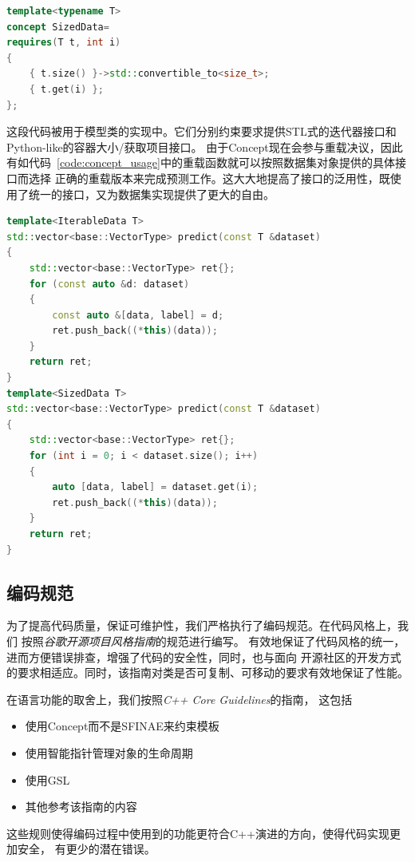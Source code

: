 \documentclass[a4paper,twoside,twocolumn]{article}
\begin{document}
\begin{spacing}{1.2}
\begin{lstlisting}[language=c++,style=CppStyle,caption={Concept},label={code:concept}]
template<typename T>
concept SizedData=
requires(T t, int i)
{
    { t.size() }->std::convertible_to<size_t>;
    { t.get(i) };
};
\end{lstlisting}
这段代码被用于模型类的实现中。它们分别约束要求提供STL式的迭代器接口和Python-like的容器大小/获取项目接口。
由于Concept现在会参与重载决议，因此有如代码~\ref{code:concept_usage}中的重载函数就可以按照数据集对象提供的具体接口而选择
正确的重载版本来完成预测工作。这大大地提高了接口的泛用性，既使用了统一的接口，又为数据集实现提供了更大的自由。

\begin{lstlisting}[language=c++,style=CppStyle,caption={Concept的使用},label={code:concept_usage}]
template<IterableData T>
std::vector<base::VectorType> predict(const T &dataset)
{
	std::vector<base::VectorType> ret{};
	for (const auto &d: dataset)
	{
		const auto &[data, label] = d;
		ret.push_back((*this)(data));
	}
	return ret;
}
template<SizedData T>
std::vector<base::VectorType> predict(const T &dataset)
{
	std::vector<base::VectorType> ret{};
	for (int i = 0; i < dataset.size(); i++)
	{
		auto [data, label] = dataset.get(i);
		ret.push_back((*this)(data));
	}
	return ret;
}
\end{lstlisting}

\subsection{编码规范}

为了提高代码质量，保证可维护性，我们严格执行了编码规范。在代码风格上，我们
按照\textit{谷歌开源项目风格指南}\cite{weinberger2013google}的规范进行编写。
有效地保证了代码风格的统一，进而方便错误排查，增强了代码的安全性，同时，也与面向
开源社区的开发方式的要求相适应。同时，该指南对类是否可复制、可移动的要求有效地保证了性能。

在语言功能的取舍上，我们按照\textit{C++ Core Guidelines}\cite{stroustrup2018c++}的指南，
这包括
\begin{itemize}
	\item 使用Concept而不是SFINAE来约束模板
	\item 使用智能指针管理对象的生命周期
	\item 使用GSL
	\item 其他参考该指南的内容
\end{itemize}
这些规则使得编码过程中使用到的功能更符合C++演进的方向，使得代码实现更加安全，
有更少的潜在错误。


\end{spacing}
\end{document}
